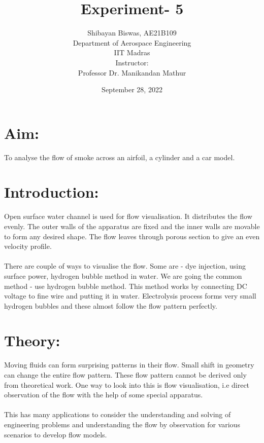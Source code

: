 \documentclass[12pt,a4paper]{article}
\author{ Shibayan Biswas, AE21B109\\ Department of Aerospace Engineering\\ IIT Madras\\[3ex] Instructor:\\ \large Professor Dr. Manikandan Mathur}
\title{Experiment- 5}
\date{September 28, 2022}
\begin{document}
\maketitle
\hline
\section{Aim:}
To analyse the flow of smoke across an airfoil, a cylinder and a car model.
\section{Introduction:}
Open surface water channel is used for flow visualisation. It distributes the flow evenly. The outer walls of the apparatus are fixed and the inner walls are movable to form any desired shape. The flow leaves through porous section to give an even velocity profile.\\
\\There are couple of ways to visualise the flow. Some are - dye injection, using surface power, hydrogen bubble method in water. We are going the common method - use hydrogen bubble method. This method works by connecting DC voltage to fine wire and
putting it in water. Electrolysis process forms very small hydrogen bubbles and these
almost follow the flow pattern perfectly.
\section{Theory:}
Moving fluids can form surprising patterns in their flow. Small shift in geometry can
change the entire flow pattern. These flow pattern cannot be derived only from theoretical work. One way to look into this is flow visualisation, i.e direct observation of the flow with the help of some special apparatus.\\
\\This has many applications to consider the understanding and solving of engineering problems and understanding the flow by observation for various scenarios to develop flow models.
\end{document}
